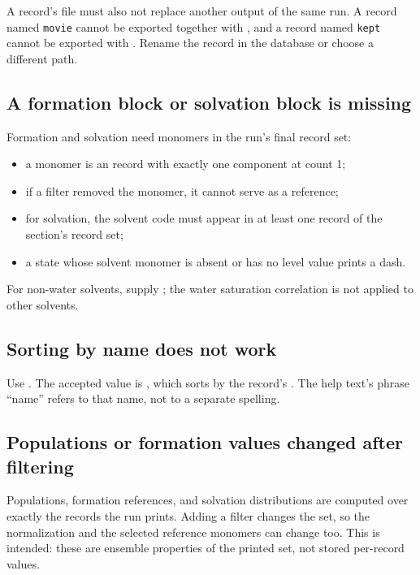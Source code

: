 A record's file must also not replace another output of the same run. A
record named \texttt{movie} cannot be exported together with ,
and a record named \texttt{kept} cannot be exported with
. Rename the record in the database or choose a
different  path.

\subsection{A formation block or solvation block is missing}

Formation and solvation need monomers in the run's final record set:

\begin{itemize}
  \item a monomer is an  record with exactly one component at count 1;
  \item if a filter removed the monomer, it cannot serve as a reference;
  \item for solvation, the solvent code must appear in at least one record of
        the section's record set;
  \item a state whose solvent monomer is absent or has no level value prints a
        dash.
\end{itemize}

For non-water solvents, supply ; the water saturation
correlation is not applied to other solvents.

\subsection{Sorting by name does not work}

Use . The accepted value is , which sorts
by the record's . The help text's phrase ``name'' refers to that
name, not to a separate spelling.

\subsection{Populations or formation values changed after filtering}

Populations, formation references, and solvation distributions are computed
over exactly the records the run prints. Adding a filter changes the set, so
the normalization and the selected reference monomers can change too. This is
intended: these are ensemble properties of the printed set, not stored
per-record values.
